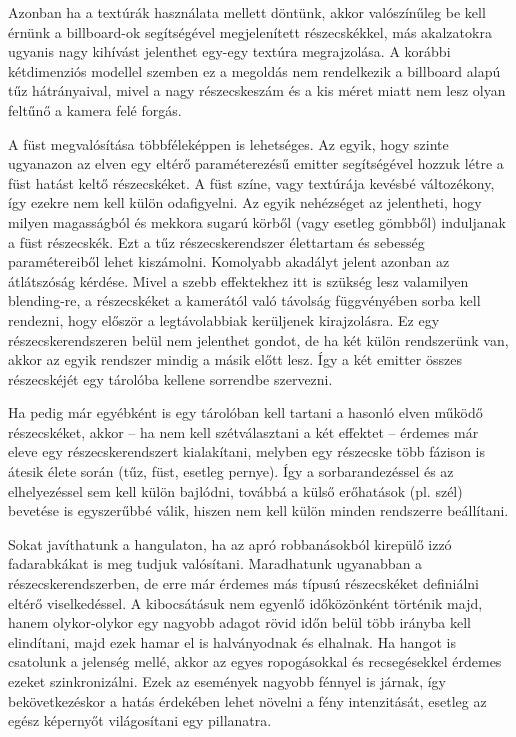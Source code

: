 Azonban ha a textúrák használata mellett döntünk, akkor valószínűleg be kell érnünk a billboard-ok segítségével megjelenített részecskékkel, más akalzatokra ugyanis nagy kihívást jelenthet egy-egy textúra megrajzolása. A korábbi kétdimenziós modellel szemben ez a megoldás nem rendelkezik a billboard alapú tűz hátrányaival, mivel a nagy részecskeszám és a kis méret miatt nem lesz olyan feltűnő a kamera felé forgás. 

A füst megvalósítása többféleképpen is lehetséges. Az egyik, hogy szinte ugyanazon az elven egy eltérő paraméterezésű emitter segítségével hozzuk létre a füst hatást keltő részecskéket. A füst színe, vagy textúrája kevésbé változékony, így ezekre nem kell külön odafigyelni. Az egyik nehézséget az jelentheti, hogy milyen magasságból és mekkora sugarú körből (vagy esetleg gömbből) induljanak a füst részecskék. Ezt a tűz részecskerendszer élettartam és sebesség paramétereiből lehet kiszámolni. Komolyabb akadályt jelent azonban az átlátszóság kérdése. Mivel a szebb effektekhez itt is szükség lesz valamilyen blending-re, a részecskéket a kamerától való távolság függvényében sorba kell rendezni, hogy először a legtávolabbiak kerüljenek kirajzolásra. Ez egy részecskerendszeren belül nem jelenthet gondot, de ha két külön rendszerünk van, akkor az egyik rendszer mindig a másik előtt lesz. Így a két emitter összes részecskéjét egy tárolóba kellene sorrendbe szervezni.

Ha pedig már egyébként is egy tárolóban kell tartani a hasonló elven működő részecskéket, akkor -- ha nem kell szétválasztani a két effektet -- érdemes már eleve egy részecskerendszert kialakítani, melyben egy részecske több fázison is átesik élete során (tűz, füst, esetleg pernye). Így a sorbarandezéssel és az elhelyezéssel sem kell külön bajlódni, továbbá a külső erőhatások (pl. szél) bevetése is egyszerűbbé válik, hiszen nem kell külön minden rendszerre beállítani.

Sokat javíthatunk a hangulaton, ha az apró robbanásokból kirepülő izzó fadarabkákat is meg tudjuk valósítani. Maradhatunk ugyanabban a részecskerendszerben, de erre már érdemes más típusú részecskéket definiálni eltérő viselkedéssel. A kibocsátásuk nem egyenlő időközönként történik majd, hanem olykor-olykor egy nagyobb adagot rövid időn belül több irányba kell elindítani, majd ezek hamar el is halványodnak és elhalnak. Ha hangot is csatolunk a jelenség mellé, akkor az egyes ropogásokkal és recsegésekkel érdemes ezeket szinkronizálni. Ezek az események nagyobb fénnyel is járnak, így bekövetkezéskor a hatás érdekében lehet növelni a fény intenzitását, esetleg az egész képernyőt világosítani egy pillanatra. 

